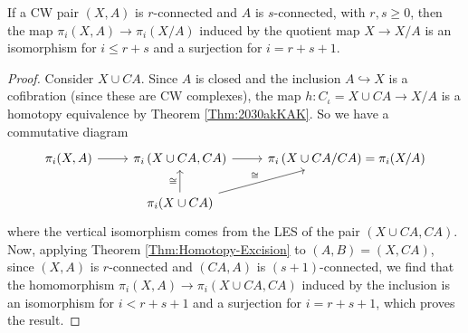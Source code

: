 \begin{proposition}[]\label{Prop:JXKDAOWJ}
    If a CW pair $\left( X,A \right) $ is $r$-connected
    and $A$ is $s$-connected, with $r,s \ge 0$, then
    the map $\pi_i (X,A) \to \pi_i (X /A)$ induced
    by the quotient map
    $X \to X / A$ is an isomorphism for
    $i \le r +s$ and a surjection for
    $i = r+s+1$.
\end{proposition}

\begin{proof}
    Consider $X \cup  CA$. Since
    $A$ is closed and the inclusion
    $A \hookrightarrow X$ is a cofibration (since these
    are CW complexes), the map
    $h \colon C_{\iota} = X \cup CA \to 
    X / A$ is a homotopy equivalence by Theorem 
    \ref{Thm:2030akKAK}. So we have a commutative
    diagram
    \begin{equation*}
    \begin{tikzcd}
        \pi_i (X,A) \ar[r] & \pi_i \left( X \cup CA, CA \right) 
        \ar[r] & \pi_i \left( X \cup  CA /CA \right) 
        = \pi_i (X / A)\\
               & \pi_i (X \cup  CA) \ar[u, "\cong"] 
               \ar[ru, "\cong"]
    \end{tikzcd}
    \end{equation*}
    where the vertical isomorphism comes from the
    LES of the pair $\left( X \cup CA, CA \right) $.
    Now, applying Theorem \ref{Thm:Homotopy-Excision}
    to $\left( A,B \right) = \left( X, CA \right) $,
    since $\left( X, A \right) $ is
    $r$-connected and
    $\left( CA, A \right) $ is
    $(s+1)$-connected, we find that the
    homomorphism 
    $\pi_i \left( X,A \right) \to 
    \pi_i \left( X \cup CA, CA \right) $ induced
    by the inclusion
    is an isomorphism for
    $i < r+s+1$ and a surjection for
    $i = r+s+1$, which proves the result.
\end{proof}


